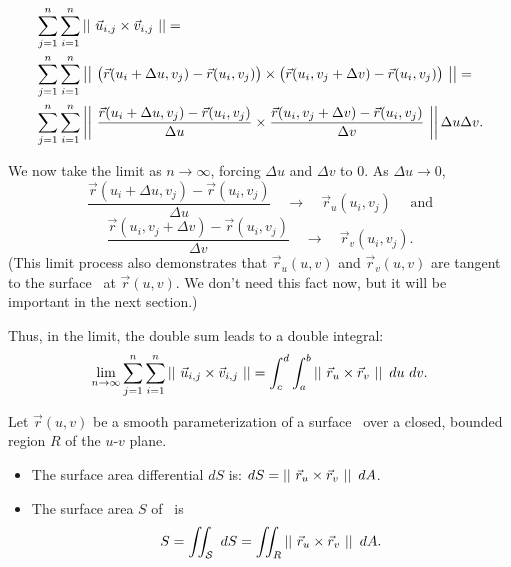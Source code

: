 \begin{align*}
&\sum_{j=1}^n\sum_{i=1}^n \left|\left|\ \vec u_{i,j}\times \vec v_{i,j}\ \right|\right|= \\ 
&\sum_{j=1}^n\sum_{i=1}^n \left|\left|\ \big(\vec r(u_i+\Delta u,v_j) - \vec r(u_i,v_j)\big) \times \big(\vec r(u_i,v_j+\Delta v)-\vec r(u_i,v_j)\big)\ \right|\right|= \\
&\sum_{j=1}^n\sum_{i=1}^n \left|\left|\ \frac{\vec r(u_i+\Delta u,v_j) - \vec r(u_i,v_j)}{\Delta u} \times \frac{\vec r(u_i,v_j+\Delta v)-\vec r(u_i,v_j)}{\Delta v}\ \right|\right|\Delta u\Delta v.
\end{align*}

We now take the limit as $n\to\infty$, forcing $\Delta u$ and $\Delta v$ to 0. As $\Delta u\to 0$,
$$\frac{\vec r(u_i+\Delta u,v_j) - \vec r(u_i,v_j)}{\Delta u}\quad \to\quad \vec r_u(u_i,v_j)\quad \text{ and} $$
$$\frac{\vec r(u_i,v_j+\Delta v)-\vec r(u_i,v_j)}{\Delta v}\quad \to\quad \vec r_v(u_i,v_j).$$
(This limit process also demonstrates that $\vec r_u(u,v)$ and $\vec r_v(u,v)$ are tangent to the surface \surfaceS\ at $\vec r(u,v)$. We don't need this fact now, but it will be important in the next section.)

Thus, in the limit, the double sum leads to a double integral:
$$\lim_{n\to\infty} \sum_{j=1}^n\sum_{i=1}^n \left|\left|\ \vec u_{i,j}\times \vec v_{i,j}\ \right|\right|= \int_c^d\int_a^b \left|\left|\ \vec r_u\times\vec r_v\ \right|\right|\ du\ dv.$$

{Let $\vec r(u,v)$ be a smooth parameterization of a surface \surfaceS\ over a closed, bounded region $R$ of the $u$-$v$ plane. 
\begin{itemize}
\item	The surface area differential $dS$ is: $dS = \snorm{\vec r_u\times \vec r_v}\ dA$.
\item The surface area $S$ of \surfaceS\ is
$$S = \iint_{\mathcal{S}}\ dS = \iint_R \left|\left|\ \vec r_u\times \vec r_v\ \right|\right|\ dA.$$
\end{itemize}
}

